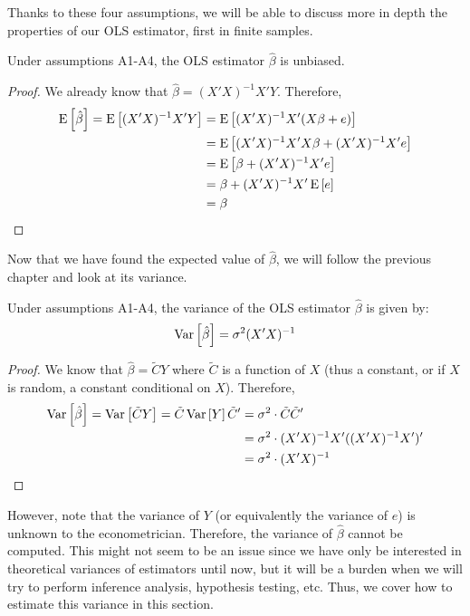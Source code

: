 Thanks to these four assumptions, we will be able to discuss more in depth the properties of our OLS estimator, first in finite samples.

\begin{proposition}
Under assumptions A1-A4, the OLS estimator $\hat\beta$ is unbiased.
\end{proposition}
\begin{proof}
We already know that $\hat\beta = (X'X)^{-1}X'Y$. Therefore, \begin{align*}
\operatorname{E}\left[\hat\beta\right] = \operatorname{E}\left[(X'X)^{-1}X'Y\right] & = \operatorname{E}\left[(X'X)^{-1}X'(X\beta + e)\right]\\
& = \operatorname{E}\left[(X'X)^{-1}X'X\beta + (X'X)^{-1}X'e\right]\\
& = \operatorname{E}\left[\beta + (X'X)^{-1}X'e\right]\\
& = \beta + (X'X)^{-1}X'\operatorname{E}\left[e\right]\\
& = \beta
\end{align*}
\end{proof}

Now that we have found the expected value of $\hat\beta$, we will follow the previous chapter and look at its variance.

\begin{proposition}
Under assumptions A1-A4, the variance of the OLS estimator $\hat\beta$ is given by: $$\operatorname{Var}\left[\hat{\beta}\right] = \sigma^2(X'X)^{-1} $$
\end{proposition}
\begin{proof}
We know that $\hat\beta = \tilde{C}Y$ where $\tilde{C}$ is a function of $X$ (thus a constant, or if $X$ is random, a constant conditional on $X$). Therefore,\begin{align*}
\operatorname{Var}\left[\hat{\beta}\right] = \operatorname{Var}\left[\tilde{C}Y\right] = \tilde{C}\operatorname{Var}\left[Y\right]\tilde{C}' & = \sigma^2\cdot \tilde{C}\tilde{C}' \\
& = \sigma^2\cdot (X'X)^{-1}X'((X'X)^{-1}X')' \\
& = \sigma^2\cdot (X'X)^{-1}
\end{align*}
\end{proof}

However, note that the variance of $Y$ (or equivalently the variance of $e$) is unknown to the econometrician. Therefore, the variance of $\hat\beta$ cannot be computed. This might not seem to be an issue since we have only be interested in theoretical variances of estimators until now, but it will be a burden when we will try to perform inference analysis, hypothesis testing, etc. Thus, we cover how to estimate this variance in this section.

